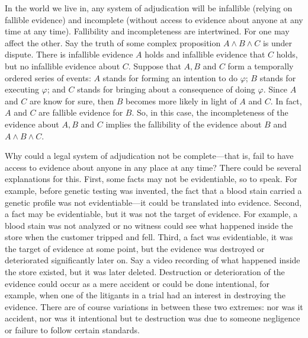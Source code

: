 \documentclass[
  10pt,
  dvipsnames,enabledeprecatedfontcommands]{scrartcl}
\begin{document}
In the world we live in, any system of adjudication will be infallible
(relying on fallible evidence) and incomplete (without access to
evidence about anyone at any time at any time). Fallibility and
incompleteness are intertwined. For one may affect the other. Say the
truth of some complex proposition \(A \wedge B \wedge C\) is under
dispute. There is infallible evidence \(A\) holds and infallible
evidence that \(C\) holds, but no infallible evidence about \(C\).
Suppose that \(A, B\) and \(C\) form a temporally ordered series of
events: \(A\) stands for forming an intention to do \(\varphi\); \(B\)
stands for executing \(\varphi\); and \(C\) stands for bringing about a
consequence of doing \(\varphi\). Since \(A\) and \(C\) are know for
sure, then \(B\) becomes more likely in light of \(A\) and \(C\). In
fact, \(A\) and \(C\) are fallible evidence for \(B\). So, in this case,
the incompleteness of the evidence about \(A, B\) and \(C\) implies the
fallibility of the evidence about \(B\) and \(A \wedge B \wedge C\).

Why could a legal system of adjudication not be complete---that is, fail
to have access to evidence about anyone in any place at any time? There
could be several explanations for this. First, some facts may not be
evidentiable, so to speak. For example, before genetic testing was
invented, the fact that a blood stain carried a genetic profile was not
evidentiable---it could be translated into evidence. Second, a fact may
be evidentiable, but it was not the target of evidence. For example, a
blood stain was not analyzed or no witness could see what happened
inside the store when the customer tripped and fell. Third, a fact was
evidentiable, it was the target of evidence at some point, but the
evidence was destroyed or deteriorated significantly later on. Say a
video recording of what happened inside the store existed, but it was
later deleted. Destruction or deterioration of the evidence could occur
as a mere accident or could be done intentional, for example, when one
of the litigants in a trial had an interest in destroying the evidence.
There are of course variations in between these two extremes: nor was it
accident, nor was it intentional but te destruction was due to someone
negligence or failure to follow certain standards.
\end{document}
